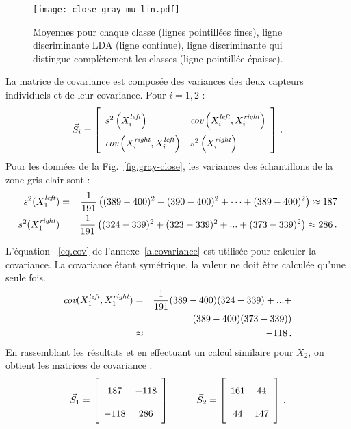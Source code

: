 \begin{figure}
\begin{center}
\texttt{[image: close-gray-mu-lin.pdf]}
\caption{Moyennes pour chaque classe (lignes pointillées fines), ligne discriminante LDA (ligne continue), ligne discriminante qui distingue complètement les classes (ligne pointillée épaisse).}
\label{fig.gray-close-mu-lin}
\end{center}
\end{figure}

La matrice de covariance est composée des variances des deux capteurs individuels et de leur covariance. Pour $i=1,2$ :
\[
\vec{S}_i = \left[
\renewcommand{\arraystretch}{2}
\begin{array}{l@{\hspace{1em}}l}
s^2\left(X_i^{\sub{left}}\right) &
\textit{cov}\left(X_i^{\sub{left}}, X_i^{\sub{right}}\right)\\
\textit{cov}\left(X_i^{\sub{right}},X_i^{\sub{left}}\right)&
s^2\left(X_i^{\sub{right}}\right)
\end{array}
\right]\,.
\]
Pour les données de la Fig.~\ref{fig.gray-close}, les variances des échantillons de la zone gris clair sont :
\begin{eqnarray*}
s^2(X_1^{\textit{\scriptsize left}}) &=& \frac{1}{191} \left((389 - 400)^2 + (390 - 400)^2 + \cdots + (389 - 400)^2 \right) \approx 187 \\
s^2(X_1^{\textit{\scriptsize right}}) &=& \frac{1}{191} \left((324 - 339)^2 + (323 - 339)^2 + ... + (373 - 339)^2 \right) \approx 286\,.
\end{eqnarray*}

L'équation ~\ref{eq.cov} de l'annexe~\ref{a.covariance} est utilisée pour calculer la covariance. La covariance étant symétrique, la valeur ne doit être calculée qu'une seule fois.
\begin{eqnarray*}
\textit{cov}(X_1^{\textit{\scriptsize left}}, X_1^{\textit{\scriptsize right}}) &=& \frac{1}{191}(389 - 400)(324 - 339) + ... +\\
&&\qquad (389 - 400)(373 - 339) )\\
&\approx& -118\,.
\end{eqnarray*}
En rassemblant les résultats et en effectuant un calcul similaire pour $X_2$, on obtient les matrices de covariance :
\[
\vec{S}_1 = \left[ \begin{array}{c} 187\\-118\end{array} \begin{array}{c} -118\\286 \end{array}\right]
\hspace{10mm}
\vec{S}_2 = \left[ \begin{array}{c} 161\\44\end{array} \begin{array}{c} 44\\147 \end{array}\right]\,.
\]

